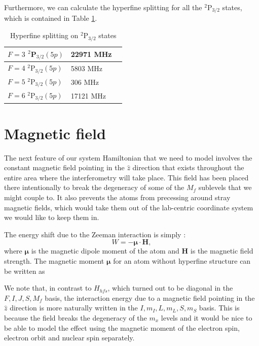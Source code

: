 Furthermore, we can calculate the hyperfine splitting for all the $^2$P$_{3/2}$ states, which is contained in Table \ref{tableOfHyperfinedeetuings}.

\begin{table}[h]
\centering
\begin{tabular}{|l|l|||r|}
\hline
$F=3$ $^2$P$_{3/2} (5p)$ & 22971  MHz\\ \hline
$F=4$ $^2$P$_{3/2} (5p)$ &  5803 MHz\\ \hline
$F=5$ $^2$P$_{3/2} (5p)$ &  306 MHz\\ \hline
$F=6$ $^2$P$_{3/2} (5p)$ &   17121 MHz\\ \hline
\end{tabular}
\caption{Hyperfine splitting on $^2$P$_{3/2}$ states}
\label{tableOfHyperfinedeetuings}
\end{table}

\section{Magnetic field}\label{zeeman}

The next feature of our system Hamiltonian that we need to model involves the constant magnetic field pointing in the $\hat{z}$ direction that exists throughout the entire area where the interferometry will take place. This field has been placed there intentionally to break the degeneracy of some of the $M_f$ sublevels that we might couple to. It also prevents the atoms from precessing around stray magnetic fields, which would take them out of the lab-centric coordinate system we would like to keep them in.

The energy shift due to the Zeeman interaction is simply \cite{sobelman_spectra}: 
\begin{equation}
W=-\mathbf{\mu}\cdot\mathbf{H},
\end{equation}
where $\mathbf{\mu}$ is the magnetic dipole moment of the atom and $\mathbf{H}$ is the magnetic field strength. The magnetic moment $\mathbf{\mu}$ for an atom without hyperfine structure can be written as \cite{sobelman_spectra}

We note that, in contrast to $H_{hfs}$, which turned out to be diagonal in the $F,I,J,S,M_f$ basis, the interaction energy due to a magnetic field pointing in the $\hat{z}$ direction is more naturally written in the $I,m_I, L,m_L,S,m_S$ basis. This is because the field breaks the degeneracy of the $m_x$ levels and it would be nice to be able to model the effect using the magnetic moment of the electron spin, electron orbit and nuclear spin separately. 

